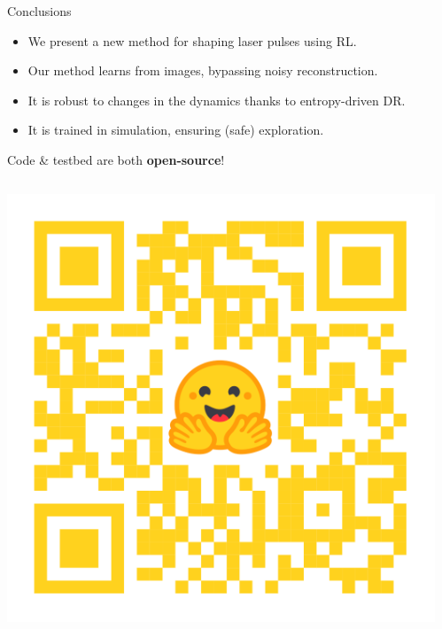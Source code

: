 \documentclass{beamer}
\newcommand{\redify}[1]{\textcolor{myprimary}{\textbf{#1}}}
\begin{document}
\begin{frame}{Conclusions}
\begin{itemize}
    \item We present a new method for shaping laser pulses using RL.
    \item Our method learns from images, bypassing noisy reconstruction.
    \item It is robust to changes in the dynamics thanks to entropy-driven DR.
    \item It is trained in simulation, ensuring (safe) exploration.
\end{itemize}

Code \& testbed are both \redify{open-source}!

\centering
\begin{columns}
    \begin{column}{0.3\textwidth}
        \includegraphics[width=\linewidth]{images/space-qr.png}
    \end{column}
    \begin{column}{0.3\textwidth}

\end{column}
\end{columns}
\end{frame}
\end{document}
